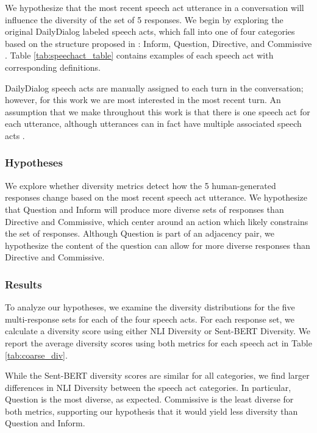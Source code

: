 \documentclass[11pt]{article}
\begin{document}
We hypothesize that the most recent speech act utterance in a conversation will influence the diversity of the set of 5  responses.
We begin by exploring the original DailyDialog labeled speech acts, which fall into one of four categories based on the structure proposed in \citet{amanova-etal-2016-creating}:  Inform, Question, Directive, and Commissive \cite{li-etal-2017-dailydialog}.  Table \ref{tab:speechact_table} contains examples of each speech act with corresponding definitions. 

DailyDialog speech acts are manually assigned to each turn in the conversation; however, for this work we are most interested in the most recent turn.
An assumption that we make throughout this work is that there is one speech act for each utterance, although utterances can in fact have multiple associated speech acts \cite{levinson_1983}.


\subsubsection{Hypotheses}

We explore whether diversity metrics detect how the 5 human-generated responses change based on the most recent speech act utterance.
We hypothesize that Question and Inform will produce more diverse sets of responses than Directive and Commissive, which center around an action which likely constrains the set of responses.  Although Question is part of an adjacency pair, we hypothesize the content of the question can allow for more diverse responses than Directive and Commissive. 

\subsubsection{Results}
To analyze our hypotheses, we examine the diversity distributions for the five multi-response sets for each of the four speech acts.  
For each response set, we calculate a diversity score using either NLI Diversity or Sent-BERT Diversity.  We report the average  diversity scores using both metrics for each speech act in Table \ref{tab:coarse_div}.  



While the Sent-BERT diversity scores are similar for all categories, we find larger differences in NLI Diversity between the speech act categories.  In particular, Question is the most diverse, as expected.   Commissive is the least diverse for both metrics, supporting our hypothesis that it would yield less diversity than Question and Inform. 
\end{document}
